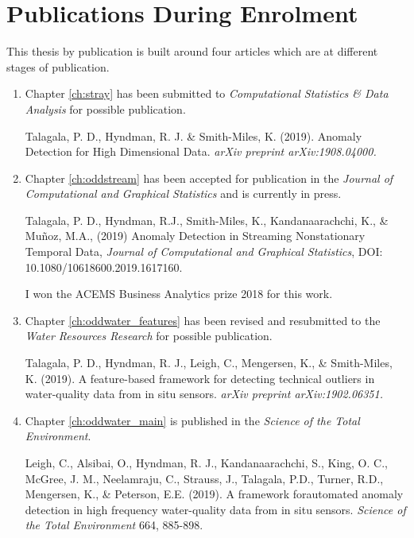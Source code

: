 \documentclass{monashthesis}
\theoremstyle{definition}
\theoremstyle{definition}
\theoremstyle{definition}
\theoremstyle{remark}
\begin{document}
\hypertarget{publications-during-enrolment}{%
\chapter*{Publications During Enrolment}\label{publications-during-enrolment}}

This thesis by publication is built around four articles which are at different stages of publication.

\begin{enumerate}
\def\labelenumi{\arabic{enumi}.}
\item
  Chapter \ref{ch:stray} has been submitted to \emph{Computational Statistics \& Data Analysis} for possible publication.

  Talagala, P. D., Hyndman, R. J. \& Smith-Miles, K. (2019). Anomaly Detection for High Dimensional Data. \emph{arXiv preprint arXiv:1908.04000.}
\item
  Chapter \ref{ch:oddstream} has been accepted for publication in the \emph{Journal of Computational and Graphical Statistics} and is currently in press.

  Talagala, P. D., Hyndman, R.J., Smith-Miles, K., Kandanaarachchi, K., \& Muñoz, M.A., (2019) Anomaly Detection in Streaming Nonstationary Temporal Data, \emph{Journal of Computational and Graphical Statistics}, DOI: 10.1080/10618600.2019.1617160.

  I won the ACEMS Business Analytics prize 2018 for this work.
\item
  Chapter \ref{ch:oddwater_features} has been revised and resubmitted to the \emph{Water Resources Research} for possible publication.

  Talagala, P. D., Hyndman, R. J., Leigh, C., Mengersen, K., \& Smith-Miles, K. (2019). A feature-based framework for detecting technical outliers in water-quality data from in situ sensors. \emph{arXiv preprint arXiv:1902.06351.}
\item
  Chapter \ref{ch:oddwater_main} is published in the \emph{Science of the Total Environment}.

  Leigh, C., Alsibai, O., Hyndman, R. J., Kandanaarachchi, S., King, O. C., McGree, J. M., Neelamraju, C., Strauss, J., Talagala, P.D., Turner, R.D., Mengersen, K., \& Peterson, E.E. (2019). A framework forautomated anomaly detection in high frequency water-quality data from in situ sensors. \emph{Science of the Total Environment} 664, 885-898.
\end{enumerate}
\end{document}
